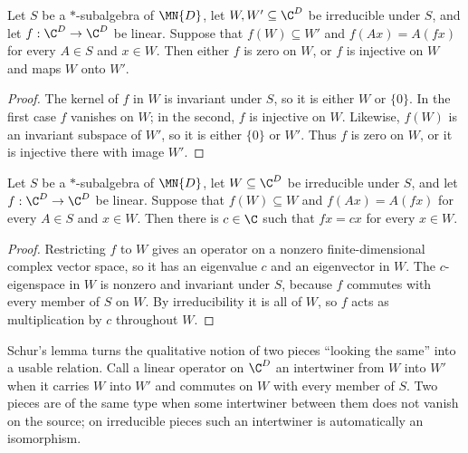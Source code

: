 \begin{lemma}%
    \label{lem:starSubalgebra_intertwiner_irreducible}
    \leanok
    Let $S$ be a $*$-subalgebra of $\MN{D}$, let
    $W,W'\subseteq\C^D$ be irreducible under $S$, and let
    $f:\C^D\to\C^D$ be linear. Suppose that $f(W)\subseteq W'$ and
    $f(Ax)=A(fx)$ for every $A\in S$ and $x\in W$. Then either $f$ is zero
    on $W$, or $f$ is injective on $W$ and maps $W$ onto $W'$.
\end{lemma}

\begin{proof}
    \leanok
    The kernel of $f$ in $W$ is invariant under $S$, so it is either $W$ or
    $\{0\}$. In the first case $f$ vanishes on $W$; in the second, $f$ is
    injective on $W$. Likewise, $f(W)$ is an invariant subspace of $W'$, so
    it is either $\{0\}$ or $W'$. Thus $f$ is zero on $W$, or it is
    injective there with image $W'$.
\end{proof}

\begin{lemma}%
    \label{lem:starSubalgebra_scalar_commutant_irreducible}
    \leanok
    Let $S$ be a $*$-subalgebra of $\MN{D}$, let
    $W\subseteq\C^D$ be irreducible under $S$, and let
    $f:\C^D\to\C^D$ be linear. Suppose that $f(W)\subseteq W$ and
    $f(Ax)=A(fx)$ for every $A\in S$ and $x\in W$. Then there is
    $c\in\C$ such that $fx=cx$ for every $x\in W$.
\end{lemma}

\begin{proof}
    \leanok
    Restricting $f$ to $W$ gives an operator on a nonzero
    finite-dimensional complex vector space, so it has an eigenvalue $c$
    and an eigenvector in $W$. The $c$-eigenspace in $W$ is nonzero and
    invariant under $S$, because $f$ commutes with every member of $S$ on
    $W$. By irreducibility it is all of $W$, so $f$ acts as multiplication
    by $c$ throughout $W$.
\end{proof}

Schur's lemma turns the qualitative notion of two pieces ``looking the same''
into a usable relation. Call a linear operator on $\C^D$ an intertwiner from
$W$ into $W'$ when it carries $W$ into $W'$ and commutes on $W$ with every
member of $S$. Two pieces are of the same type when some intertwiner between
them does not vanish on the source; on irreducible pieces such an
intertwiner is automatically an isomorphism.

